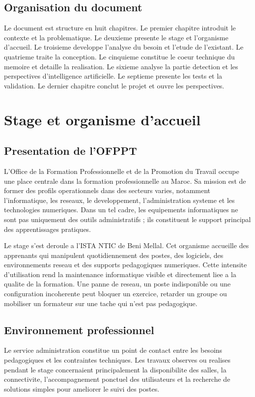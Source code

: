 \documentclass[12pt,a4paper]{report}
\begin{document}
\section{Organisation du document}
Le document est structure en huit chapitres. Le premier chapitre introduit le contexte et la problematique. Le deuxieme presente le stage et l'organisme d'accueil. Le troisieme developpe l'analyse du besoin et l'etude de l'existant. Le quatrieme traite la conception. Le cinquieme constitue le coeur technique du memoire et detaille la realisation. Le sixieme analyse la partie detection et les perspectives d'intelligence artificielle. Le septieme presente les tests et la validation. Le dernier chapitre conclut le projet et ouvre les perspectives.

\chapter{Stage et organisme d'accueil}

\section{Presentation de l'OFPPT}
L'Office de la Formation Professionnelle et de la Promotion du Travail occupe une place centrale dans la formation professionnelle au Maroc. Sa mission est de former des profils operationnels dans des secteurs varies, notamment l'informatique, les reseaux, le developpement, l'administration systeme et les technologies numeriques. Dans un tel cadre, les equipements informatiques ne sont pas uniquement des outils administratifs ; ils constituent le support principal des apprentissages pratiques.

Le stage s'est deroule a l'ISTA NTIC de Beni Mellal. Cet organisme accueille des apprenants qui manipulent quotidiennement des postes, des logiciels, des environnements reseau et des supports pedagogiques numeriques. Cette intensite d'utilisation rend la maintenance informatique visible et directement liee a la qualite de la formation. Une panne de reseau, un poste indisponible ou une configuration incoherente peut bloquer un exercice, retarder un groupe ou mobiliser un formateur sur une tache qui n'est pas pedagogique.

\section{Environnement professionnel}
Le service administration constitue un point de contact entre les besoins pedagogiques et les contraintes techniques. Les travaux observes ou realises pendant le stage concernaient principalement la disponibilite des salles, la connectivite, l'accompagnement ponctuel des utilisateurs et la recherche de solutions simples pour ameliorer le suivi des postes.
\end{document}
